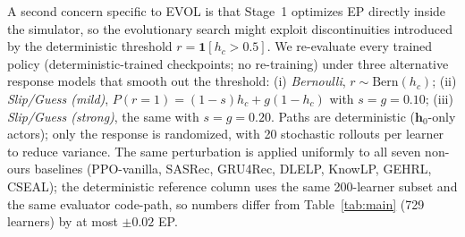 \documentclass[sigconf,anonymous]{acmart}
\newcommand{\ours}{\textrm{EVOL}}
\begin{document}
A second concern specific to \ours{} is that Stage~1 optimizes EP directly inside the simulator, so the evolutionary search might exploit discontinuities introduced by the deterministic threshold $r\!=\!\mathbf{1}[h_c\!>\!0.5]$. We re-evaluate every trained policy (deterministic-trained checkpoints; no re-training) under three alternative response models that smooth out the threshold:
(i) \emph{Bernoulli}, $r\!\sim\!\mathrm{Bern}(h_c)$;
(ii) \emph{Slip/Guess (mild)}, $P(r{=}1)=(1{-}s)h_c + g(1{-}h_c)$ with $s\!=\!g\!=\!0.10$;
(iii) \emph{Slip/Guess (strong)}, the same with $s\!=\!g\!=\!0.20$.
Paths are deterministic ($\mathbf{h}_0$-only actors); only the response is randomized, with 20 stochastic rollouts per learner to reduce variance. The same perturbation is applied uniformly to all seven non-ours baselines (PPO-vanilla, SASRec, GRU4Rec, DLELP, KnowLP, GEHRL, CSEAL); the deterministic reference column uses the same 200-learner subset and the same evaluator code-path, so numbers differ from Table~\ref{tab:main} (729 learners) by at most $\pm 0.02$ EP.
\end{document}
